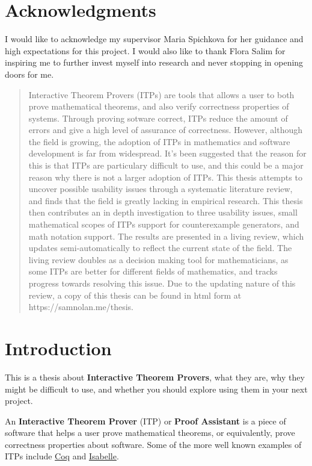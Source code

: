 \documentclass[
]{article}
\begin{document}
\section*{Acknowledgments}
I would like to acknowledge my supervisor Maria Spichkova for her
guidance and high expectations for this project. I would also like to
thank Flora Salim for inspiring me to further invest myself into
research and never stopping in opening doors for me.

\newpage

\begin{abstract}
Interactive Theorem Provers (ITPs) are tools that allows a user to both
prove mathematical theorems, and also verify correctness properties of
systems. Through proving sotware correct, ITPs reduce the amount of
errors and give a high level of assurance of correctness. However,
although the field is growing, the adoption of ITPs in mathematics and
software development is far from widespread. It's been suggested that
the reason for this is that ITPs are particulary difficult to use, and
this could be a major reason why there is not a larger adoption of ITPs.
This thesis attempts to uncover possible usability issues through a
systematic literature review, and finds that the field is greatly
lacking in empirical research. This thesis then contributes an in depth
investigation to three usability issues, small mathematical scopes of
ITPs support for counterexample generators, and math notation support.
The results are presented in a living review, which updates
semi-automatically to reflect the current state of the field. The living
review doubles as a decision making tool for mathematicians, as some
ITPs are better for different fields of mathematics, and tracks progress
towards resolving this issue. Due to the updating nature of this review,
a copy of this thesis can be found in html form at
https://samnolan.me/thesis.
\end{abstract}
\newpage

\tableofcontents
\newpage

\hypertarget{introduction}{%
\section{Introduction}\label{introduction}}

This is a thesis about \textbf{Interactive Theorem Provers}, what they
are, why they might be difficult to use, and whether you should explore
using them in your next project.

An \textbf{Interactive Theorem Prover} (ITP) or \textbf{Proof Assistant}
is a piece of software that helps a user prove mathematical theorems, or
equivalently, prove correctness properties about software. Some of the
more well known examples of ITPs include
\href{https://coq.inria.fr/}{Coq} and
\href{https://isabelle.in.tum.de/}{Isabelle}.
\end{document}
